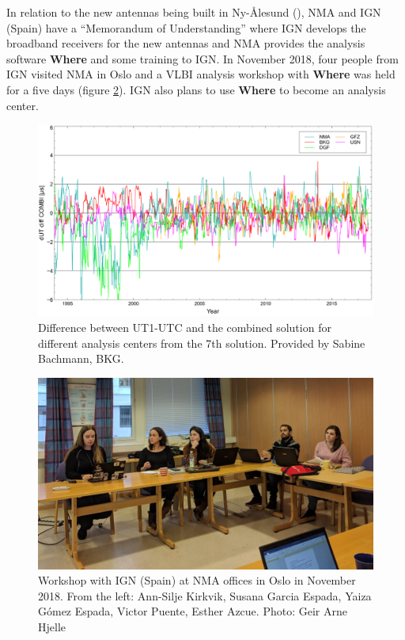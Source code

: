 \documentclass[twocolumn,twoside]{svmultivs_br} %
\begin{document}
In relation to the new antennas being built in Ny-\AA lesund (\cite{kupiszewski2019}), NMA and IGN (Spain) have a
“Memorandum of Understanding” where IGN develops the broadband receivers for the new antennas and NMA provides the
analysis software \textbf{Where} and some training to IGN. In November 2018, four people from IGN visited NMA in Oslo and a VLBI analysis workshop with
\textbf{Where} was held for a five days (figure \ref{fig:workshop}). IGN also plans to use \textbf{Where} to become an
analysis center.

\begin{figure}[htbp!]
\includegraphics[width=\linewidth]{acnma01.png}
\caption{Difference between UT1-UTC and the combined solution for different analysis centers from the 7th solution.
Provided by Sabine Bachmann, BKG.}
\label{fig:dut1}
\end{figure}

\begin{figure}[htbp!]
\includegraphics[width=\linewidth]{acnma02.jpg}
\caption{Workshop with IGN (Spain) at NMA offices in Oslo in November 2018. From the left:  Ann-Silje Kirkvik,
Susana Garcia Espada, Yaiza G\' omez Espada, Victor Puente, Esther Azcue. Photo:
Geir Arne Hjelle}
\label{fig:workshop}
\end{figure}
\end{document}
